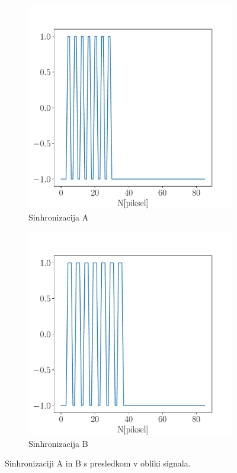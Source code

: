 \documentclass{article}
\begin{document}
\begin{figure}[H]
    \centering
    \begin{subfigure}[b]{0.45\textwidth}
        \centering
        \includegraphics[width=\textwidth]{sync_frame0.pdf}
        \caption{Sinhronizacija A}
    \end{subfigure}
    \hfill
    \begin{subfigure}[b]{0.45\textwidth}
        \centering
        \includegraphics[width=\textwidth]{sync_frame1.pdf}
        \caption{Sinhronizacija B}
    \end{subfigure}

    \caption{Sinhronizaciji A in B s presledkom v obliki signala.}
    \label{fig:sync_frames}
\end{figure}
\end{document}
